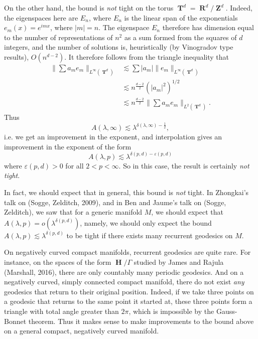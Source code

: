 \documentclass{article}
\DeclareMathOperator{\ZZ}{\mathbf{Z}}
\DeclareMathOperator{\RR}{\mathbf{R}}
\DeclareMathOperator{\HH}{\mathbf{H}}
\DeclareMathOperator{\TT}{\mathbf{T}}
\theoremstyle{plain}
\theoremstyle{remark}
\theoremstyle{definition}
\begin{document}
On the other hand, the bound is \emph{not} tight on the torus $\TT^d = \RR^d / \ZZ^d$. Indeed, the eigenspaces here are $E_n$, where $E_n$ is the linear span of the exponentials $e_m(x) = e^{i m x}$, where $|m| = n$. The eigenspace $E_n$ therefore has dimension equal to the number of representations of $n^2$ as a sum formed from the squares of $d$ integers, and the number of solutions is, heuristically (by Vinogradov type results), $O(n^{d-2})$. It therefore follows from the triangle inequality that
%
\begin{align*}
    \| \sum a_m e_m \|_{L^\infty(\TT^d)} &\lesssim \sum |a_m| \| e_m \|_{L^\infty(\TT^d)}\\
    &\lesssim n^{\frac{d-2}{2}} \left( |a_m|^2 \right)^{1/2}\\
    &\lesssim n^{\frac{d-2}{2}} \| \sum a_m e_m \|_{L^2(\TT^d)}.
\end{align*}
%
Thus
%
\[ A(\lambda,\infty) \lesssim \lambda^{\delta(\lambda,\infty) - \frac{1}{2}}, \]
%
i.e. we get an improvement in the exponent, and interpolation gives an improvement in the exponent of the form
%
\[ A(\lambda,p) \lesssim \lambda^{\delta(p,d) - \varepsilon(p,d)} \]
%
where $\varepsilon(p,d) > 0$ for all $2 < p < \infty$. So in this case, the result is certainly \emph{not tight}.

In fact, we should expect that in general, this bound is \emph{not} tight. In Zhongkai's talk on (Sogge, Zelditch, 2009), and in Ben and Jaume's talk on (Sogge, Zelditch), we saw that for a generic manifold $M$, we should expect that $A(\lambda,p) = o( \lambda^{\delta(p,d)} )$, namely, we should only expect the bound $A(\lambda,p) \lesssim \lambda^{\delta(p,d)}$ to be tight if there exists many recurrent geodesics on $M$.

On negatively curved compact manifolds, recurrent geodesics are quite rare. For instance, on the spaces of the form $\HH / \Gamma$ studied by James and Rajula (Marshall, 2016), there are only countably many periodic geodesics. And on a negatively curved, simply connected compact manifold, there do not exist \emph{any} geodesics that return to their original position. Indeed, if we take three points on a geodesic that returns to the same point it started at, these three points form a triangle with total angle greater than $2\pi$, which is impossible by the Gauss-Bonnet theorem. Thus it makes sense to make improvements to the bound above on a general compact, negatively curved manifold.
\end{document}
